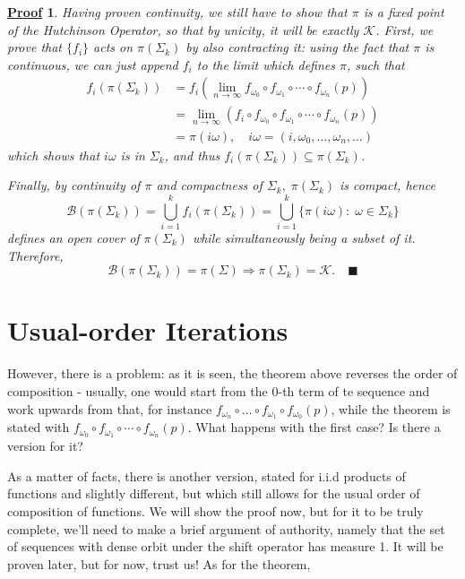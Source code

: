\documentclass{article}
\newtheorem*{proof*}{\underline{Proof}}
\renewcommand\qedsymbol{$\blacksquare$}
\begin{document}
\begin{proof*}
	Having proven continuity, we still have to show that \(\pi \) is a fixed point of the Hutchinson Operator, so that by unicity, it will be exactly \(\mathcal{K}\). First, we prove that \(\{f_{i}\}\) acts on \(\pi (\Sigma_{k})\)
	by also contracting it: using the fact that \(\pi \) is continuous, we can just append \(f_{i}\) to the limit which defines \(\pi \), such that
	\begin{align*}
		f_{i}(\pi(\Sigma_{k})) & = f_{i}(\lim_{n\to \infty}f_{\omega_{0}}\circ f_{\omega_{1}}\circ\cdots\circ f_{\omega_{n}}(p))       \\
		                       & = \lim_{n\to \infty}(f_{i}\circ f_{\omega_{0}}\circ f_{\omega_{1}}\circ\cdots\circ f_{\omega_{n}}(p)) \\
		                       & = \pi(i\omega ),\quad i\omega = (i, \omega_{0}, \dotsc , \omega_{n}, \dotsc )
	\end{align*}
	which shows that \(i\omega \) is in \(\Sigma_{k} \), and thus \(f_{i}(\pi(\Sigma_{k}))\subseteq \pi(\Sigma_{k})\).

	Finally, by continuity of \(\pi \) and compactness of \(\Sigma_{k} , \; \pi(\Sigma_{k})\) is compact, hence
	\[
		\mathcal{B}(\pi(\Sigma_{k}))=\bigcup_{i=1}^{k}f_{i}(\pi(\Sigma_{k}))=\bigcup_{i=1}^{k}\{\pi(i\omega ):\;\omega \in \Sigma_{k}\}
	\]
	defines an open cover of \(\pi(\Sigma_{k})\) while simultaneously being a subset of it. Therefore,
	\[
		\mathcal{B}(\pi(\Sigma_{k}))=\pi(\Sigma ) \Rightarrow \pi(\Sigma_{k})=\mathcal{K}.\quad \text{\qedsymbol}
	\]
\end{proof*}
\section{Usual-order Iterations}
However, there is a problem: as it is seen, the theorem above reverses the order of composition - usually, one would start from the 0-th term of te sequence and work upwards from that, for instance \(f_{\omega_{n}}\circ \dotsc \circ f_{\omega_{1}}\circ f_{\omega_{0}}(p)\),
while the theorem is stated with \(f_{\omega_{0}}\circ f_{\omega_{1}}\circ\cdots\circ f_{\omega_{n}}(p)\). What happens with the first case? Is there a version for it?

As a matter of facts, there is another version, stated for i.i.d products of functions and slightly different, but which still allows for the usual order of composition of functions. We will show the proof now, but for it to be truly complete,
we'll need to make a brief argument of authority, namely that the set of sequences with dense orbit under the shift operator has measure 1. It will be proven later, but for now, trust us! As for the theorem,
\end{document}
